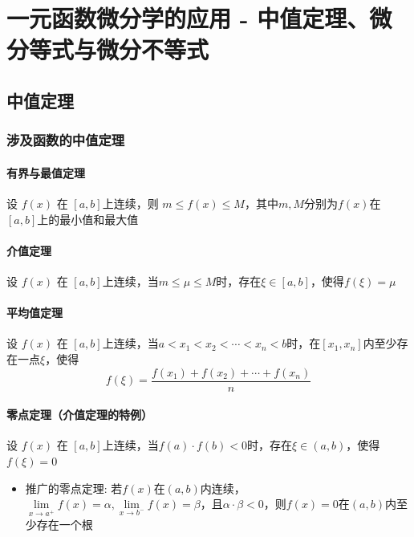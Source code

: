 \documentclass[../book.tex]{subfiles}
\begin{document}
    \section{一元函数微分学的应用 - 中值定理、微分等式与微分不等式}

    \subsection{中值定理}

    \subsubsection{涉及函数的中值定理}

    \paragraph{有界与最值定理}

    设 $f(x)$ 在 $[a, b]$上连续，则 $m \leq f(x) \leq M$，其中$m, M$分别为$f(x)$在$[a, b]$上的最小值和最大值

    \paragraph{介值定理}

    设 $f(x)$ 在 $[a, b]$上连续，当$m \leq \mu \leq M$时，存在$\xi \in [a, b]$，使得$f(\xi) = \mu$

    \paragraph{平均值定理}

    设 $f(x)$ 在 $[a, b]$上连续，当$a < x_1 < x_2 < \cdots < x_n < b$时，在$[x_1, x_n]$内至少存在一点$\xi$，使得
    \[
        f(\xi) = \frac{f(x_1) + f(x_2) + \cdots + f(x_n)}{n}
    \]

    \paragraph{零点定理（介值定理的特例）}

    设 $f(x)$ 在 $[a, b]$上连续，当$f(a)\cdot f(b) < 0$时，存在$\xi \in (a, b)$，使得$f(\xi) = 0$
    \begin{itemize}
        \item 推广的零点定理: 若$f(x)$在$(a, b)$内连续，$\lim\limits_{x \to a^+} f(x) = \alpha, \lim\limits_{x \to b^-} f(x) = \beta$，且$\alpha \cdot \beta < 0$，则$f(x) = 0$在$(a, b)$内至少存在一个根
    \end{itemize}
\end{document}
